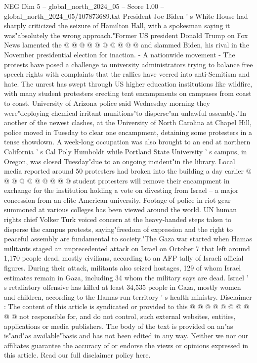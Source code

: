 \begin{textsample}{NEG Dim 5 – global\_north\_2024\_05 – Score 1.00 – global\_north\_2024\_05/107873689.txt}
President Joe Biden ' s White House had sharply criticized the seizure of Hamilton Hall, with a spokesman saying it was"absolutely the wrong approach."Former US president Donald Trump on Fox News lamented the @ @ @ @ @ @ @ @ @ @ and slammed Biden, his rival in the November presidential election for inaction. - A nationwide movement - The protests have posed a challenge to university administrators trying to balance free speech rights with complaints that the rallies have veered into anti-Semitism and hate.
The unrest has swept through US higher education institutions like wildfire, with many student protesters erecting tent encampments on campuses from coast to coast.
University of Arizona police said Wednesday morning they were"deploying chemical irritant munitions"to disperse"an unlawful assembly."In another of the newest clashes, at the University of North Carolina at Chapel Hill, police moved in Tuesday to clear one encampment, detaining some protesters in a tense showdown.
A week-long occupation was also brought to an end at northern California ' s Cal Poly Humboldt while Portland State University ' s campus, in Oregon, was closed Tuesday"due to an ongoing incident"in the library.
Local media reported around 50 protesters had broken into the building a day earlier @ @ @ @ @ @ @ @ @ @ student protesters will remove their encampment in exchange for the institution holding a vote on divesting from Israel -- a major concession from an elite American university.
Footage of police in riot gear summoned at various colleges has been viewed around the world.
UN human rights chief Volker Turk voiced concern at the heavy-handed steps taken to disperse the campus protests, saying"freedom of expression and the right to peaceful assembly are fundamental to society."The Gaza war started when Hamas militants staged an unprecedented attack on Israel on October 7 that left around 1,170 people dead, mostly civilians, according to an AFP tally of Israeli official figures.
During their attack, militants also seized hostages, 129 of whom Israel estimates remain in Gaza, including 34 whom the military says are dead.
Israel ' s retaliatory offensive has killed at least 34,535 people in Gaza, mostly women and children, according to the Hamas-run territory ' s health ministry.
Disclaimer : The content of this article is syndicated or provided to this @ @ @ @ @ @ @ @ @ @ not responsible for, and do not control, such external websites, entities, applications or media publishers.
The body of the text is provided on an"as is"and"as available"basis and has not been edited in any way.
Neither we nor our affiliates guarantee the accuracy of or endorse the views or opinions expressed in this article.
Read our full disclaimer policy here.

\end{textsample}

